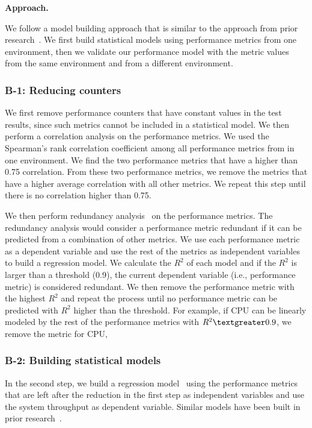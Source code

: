 \noindent \textbf{Approach. }

We follow a model building approach that is similar to the approach from prior research~\cite{Shang:2015:ADP:2668930.2688052,Cohen:2005:CIC:1095810.1095821,xiong2013vperfguard}. We first build statistical models using performance metrics from one environment, then we validate our performance model with the metric values from the same environment and from a different environment.
\subsubsection{B-1: Reducing counters}

We first remove performance counters that have constant values in the test results, since such metrics cannot be included in a statistical model. We then perform a correlation analysis on the performance metrics. We used the Spearman's rank correlation coefficient among all performance metrics from in one environment. We find the two performance metrics that have a higher than 0.75 correlation. From these two performance metrics, we remove the metrics that have a higher average correlation with all other metrics. We repeat this step until there is no correlation higher than 0.75.

We then perform redundancy analysis~\cite{harrell2001regression} on the performance metrics. The redundancy analysis would consider a performance metric redundant if it can be predicted from a combination of other metrics. We use each performance metric as a dependent variable and use the rest of the metrics as independent variables to build a regression model. We calculate the $R^2$ of each model and if the $R^2$ is larger than a threshold (0.9), the current dependent variable (i.e., performance metric) is considered redundant. We then remove the performance metric with the highest $R^2$ and repeat the process until no performance metric can be predicted with $R^2$ higher than the threshold. For example, if CPU can be linearly modeled by the rest of the performance metrics with $R^2\textgreater0.9$, we remove the metric for CPU, 

\subsubsection{B-2: Building statistical models}

In the second step, we build a regression model~\cite{freedman2009statistical} using the performance metrics that are left after the reduction in the first step as independent variables and use the system throughput as dependent variable. Similar models have been built in prior research~\cite{Cohen:2005:CIC:1095810.1095821,xiong2013vperfguard}.


